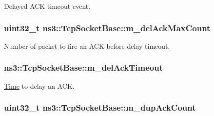 Delayed A\+CK timeout event. 

\subsubsection[{\texorpdfstring{m\+\_\+del\+Ack\+Max\+Count}{m_delAckMaxCount}}]{\setlength{\rightskip}{0pt plus 5cm}uint32\+\_\+t ns3\+::\+Tcp\+Socket\+Base\+::m\+\_\+del\+Ack\+Max\+Count\hspace{0.3cm}{\ttfamily [protected]}}\hypertarget{classns3_1_1TcpSocketBase_a8a36367ad1e6e7e70827e4c4ba746240}{}\label{classns3_1_1TcpSocketBase_a8a36367ad1e6e7e70827e4c4ba746240}


Number of packet to fire an A\+CK before delay timeout. 

\subsubsection[{\texorpdfstring{m\+\_\+del\+Ack\+Timeout}{m_delAckTimeout}}]{ ns3\+::\+Tcp\+Socket\+Base\+::m\+\_\+del\+Ack\+Timeout\hspace{0.3cm}{\ttfamily [protected]}}\hypertarget{classns3_1_1TcpSocketBase_ad7eb8814b40c3d1c26b60df6759748d4}{}\label{classns3_1_1TcpSocketBase_ad7eb8814b40c3d1c26b60df6759748d4}


\hyperlink{classns3_1_1Time}{Time} to delay an A\+CK. 

\subsubsection[{\texorpdfstring{m\+\_\+dup\+Ack\+Count}{m_dupAckCount}}]{\setlength{\rightskip}{0pt plus 5cm}uint32\+\_\+t ns3\+::\+Tcp\+Socket\+Base\+::m\+\_\+dup\+Ack\+Count\hspace{0.3cm}{\ttfamily [protected]}}\hypertarget{classns3_1_1TcpSocketBase_a4cf1d54115a5b2c8db34b62b6ccfa541}{}\label{classns3_1_1TcpSocketBase_a4cf1d54115a5b2c8db34b62b6ccfa541}


